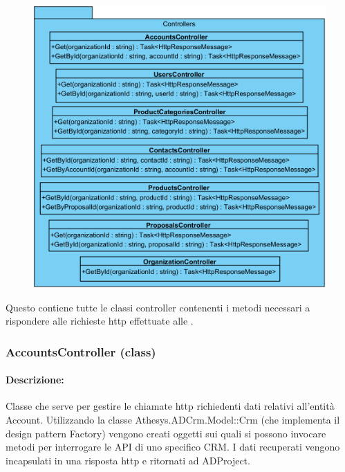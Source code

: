 \begin{figure}[H]
	\centering
	\includegraphics[width=\linewidth]{images/modules/Controllers}
	\caption{}
	\label{fig:controllers}
\end{figure}


Questo  contiene tutte le classi controller contenenti i metodi necessari a rispondere alle richieste http effettuate alle .

\subsubsection{AccountsController (class)}

\paragraph{Descrizione:}
Classe che serve per gestire le chiamate http richiedenti dati relativi all'entità Account. Utilizzando la classe Athesys.ADCrm.Model::Crm (che implementa il design pattern Factory) vengono creati oggetti sui quali si possono invocare metodi per interrogare le API di uno specifico CRM.
I dati recuperati vengono incapsulati in una risposta http e ritornati ad ADProject.

